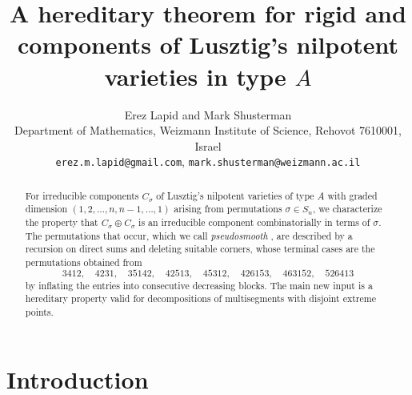 \documentclass[12pt]{article}
\title{A hereditary theorem for rigid and \prig components of Lusztig's nilpotent varieties in type $A$}
\author{Erez Lapid and Mark Shusterman\\[3pt]
\normalsize Department of Mathematics, Weizmann Institute of Science, Rehovot 7610001, Israel\\[2pt]
\normalsize\texttt{erez.m.lapid@gmail.com}, \texttt{mark.shusterman@weizmann.ac.il}}
\date{}
\def\xspace{ }%
\theoremstyle{definition}
\newcommand{\psm}{pseudosmooth\xspace}
\newcommand{\cmp}{C}                       %
\begin{document}
\maketitle

\begin{abstract}
\noindent
For irreducible components $\cmp_\sigma$ of Lusztig's nilpotent varieties of type $A$
with graded dimension $(1,2,\dots,n,n-1,\dots,1)$ arising from permutations $\sigma\in S_n$, we 
characterize the property that $\cmp_\sigma\oplus\cmp_\sigma$ is an irreducible component
combinatorially in terms of $\sigma$. The permutations that occur, which we call
\emph{\psm}, are described by a recursion on direct sums and deleting suitable corners, whose terminal
cases are the permutations obtained from
\[
3412,\quad 4231,\quad 35142,\quad 42513,\quad 45312,\quad 426153,\quad 463152,\quad 526413
\]
by inflating the entries into consecutive decreasing blocks. The main new input is a
hereditary property valid
for decompositions of multisegments with disjoint extreme points.
\end{abstract}

\setcounter{tocdepth}{1}
\tableofcontents

\section{Introduction}\label{sec:intro}
\end{document}
